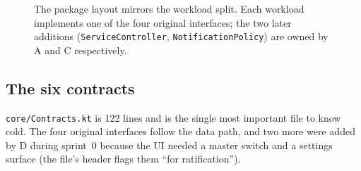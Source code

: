 \documentclass[10pt,a4paper]{article}
\newcommand{\file}[1]{\texttt{\small #1}}          %
\newcommand{\code}[1]{\texttt{#1}}                  %
\begin{document}
\begin{figure}[htbp]
{}
\caption{The package layout mirrors the workload split. Each workload implements one of the four
original interfaces; the two later additions (\code{ServiceController}, \code{NotificationPolicy})
are owned by A and C respectively.}\label{fig:workloads}
\end{figure}

\subsection{The six contracts}

\file{core/Contracts.kt} is 122 lines and is the single most important file to know cold. The
four original interfaces follow the data path, and two more were added by D during sprint~0
because the UI needed a master switch and a settings surface (the file's header flags them
``for ratification'').
\end{document}
